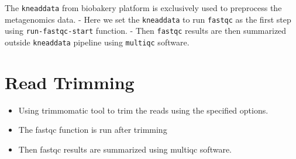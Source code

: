\documentclass[
  12pt,
  openany]{book}
\newenvironment{Shaded}{\begin{snugshade}}{\end{snugshade}}
\newcommand{\AttributeTok}[1]{\textcolor[rgb]{0.77,0.63,0.00}{#1}}
\newcommand{\BuiltInTok}[1]{#1}
\newcommand{\ControlFlowTok}[1]{\textcolor[rgb]{0.13,0.29,0.53}{\textbf{#1}}}
\newcommand{\DataTypeTok}[1]{\textcolor[rgb]{0.13,0.29,0.53}{#1}}
\newcommand{\ExtensionTok}[1]{#1}
\newcommand{\FunctionTok}[1]{\textcolor[rgb]{0.00,0.00,0.00}{#1}}
\newcommand{\KeywordTok}[1]{\textcolor[rgb]{0.13,0.29,0.53}{\textbf{#1}}}
\newcommand{\NormalTok}[1]{#1}
\newcommand{\PreprocessorTok}[1]{\textcolor[rgb]{0.56,0.35,0.01}{\textit{#1}}}
\newcommand{\StringTok}[1]{\textcolor[rgb]{0.31,0.60,0.02}{#1}}
\newcommand{\VariableTok}[1]{\textcolor[rgb]{0.00,0.00,0.00}{#1}}
\providecommand{\tightlist}{%
  \setlength{\itemsep}{0pt}\setlength{\parskip}{0pt}}
\begin{document}
The \texttt{kneaddata} from biobakery platform is exclusively used to preprocess the metagenomics data.
- Here we set the \texttt{kneaddata} to run \texttt{fastqc} as the first step using \texttt{run-fastqc-start} function.
- Then \texttt{fastqc} results are then summarized outside \texttt{kneaddata} pipeline using \texttt{multiqc} software.

\begin{Shaded}
\end{Shaded}

\hypertarget{read-trimming}{%
\section{Read Trimming}\label{read-trimming}}

\begin{itemize}
\tightlist
\item
  Using trimmomatic tool to trim the reads using the specified options.
\item
  The fastqc function is run after trimming
\item
  Then fastqc results are summarized using multiqc software.
\end{itemize}
\end{document}
